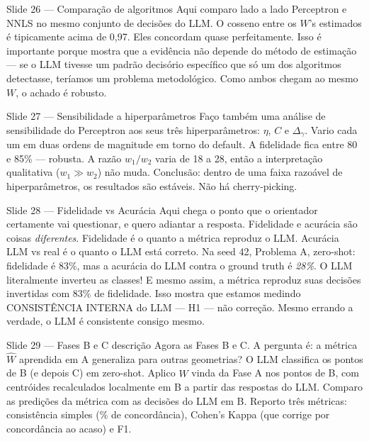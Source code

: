 \documentclass[aspectratio=169,10pt]{beamer}
\begin{document}
\begin{frame}{Slide 26 --- Compara\c{c}\~ao de algoritmos}
\footnotesize
Aqui comparo lado a lado Perceptron e NNLS no mesmo conjunto de decis\~oes do LLM. O cosseno entre os $W$'s estimados \'e tipicamente acima de 0{,}97. Eles concordam quase perfeitamente. Isso \'e importante porque mostra que a evid\^encia n\~ao depende do m\'etodo de estima\c{c}\~ao --- se o LLM tivesse um padr\~ao decis\'orio espec\'ifico que s\'o um dos algoritmos detectasse, ter\'iamos um problema metodol\'ogico. Como ambos chegam ao mesmo $W$, o achado \'e robusto.
\end{frame}

\begin{frame}{Slide 27 --- Sensibilidade a hiperpar\^ametros}
\footnotesize
Fa\c{c}o tamb\'em uma an\'alise de sensibilidade do Perceptron aos seus tr\^es hiperpar\^ametros: $\eta$, $C$ e $\Delta_\gamma$. Vario cada um em duas ordens de magnitude em torno do default. A fidelidade fica entre 80 e 85\% --- robusta. A raz\~ao $w_1/w_2$ varia de 18 a 28, ent\~ao a interpreta\c{c}\~ao qualitativa ($w_1 \gg w_2$) n\~ao muda. Conclus\~ao: dentro de uma faixa razo\'avel de hiperpar\^ametros, os resultados s\~ao est\'aveis. N\~ao h\'a cherry-picking.
\end{frame}

\begin{frame}{Slide 28 --- Fidelidade vs Acur\'acia}
\footnotesize
Aqui chega o ponto que o orientador certamente vai questionar, e quero adiantar a resposta. Fidelidade e acur\'acia s\~ao coisas \emph{diferentes}. Fidelidade \'e o quanto a m\'etrica reproduz o LLM. Acur\'acia LLM vs real \'e o quanto o LLM est\'a correto. Na seed 42, Problema A, zero-shot: fidelidade \'e 83\%, mas a acur\'acia do LLM contra o ground truth \'e \emph{28\%}. O LLM literalmente inverteu as classes! E mesmo assim, a m\'etrica reproduz suas decis\~oes invertidas com 83\% de fidelidade. Isso mostra que estamos medindo CONSIST\^ENCIA INTERNA do LLM --- H1 --- n\~ao corre\c{c}\~ao. Mesmo errando a verdade, o LLM \'e consistente consigo mesmo.
\end{frame}

\begin{frame}{Slide 29 --- Fases B e C descri\c{c}\~ao}
\footnotesize
Agora as Fases B e C. A pergunta \'e: a m\'etrica $\hat W$ aprendida em A generaliza para outras geometrias? O LLM classifica os pontos de B (e depois C) em zero-shot. Aplico $\hat W$ vinda da Fase A nos pontos de B, com centr\'oides recalculados localmente em B a partir das respostas do LLM. Comparo as predi\c{c}\~oes da m\'etrica com as decis\~oes do LLM em B. Reporto tr\^es m\'etricas: consist\^encia simples (\% de concord\^ancia), Cohen's Kappa (que corrige por concord\^ancia ao acaso) e F1.
\end{frame}
\end{document}
